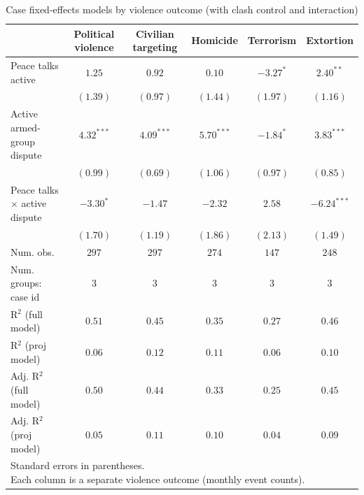 
\begin{table}
\caption{Case fixed-effects models by violence outcome (with clash control and interaction)}
\begin{center}
\begin{tabular}{l c c c c c}
\toprule
 & Political violence & Civilian targeting & Homicide & Terrorism & Extortion \\
\midrule
Peace talks active           & $1.25$       & $0.92$       & $0.10$       & $-3.27^{*}$ & $2.40^{**}$   \\
                             & $(1.39)$     & $(0.97)$     & $(1.44)$     & $(1.97)$    & $(1.16)$      \\
Active armed-group dispute   & $4.32^{***}$ & $4.09^{***}$ & $5.70^{***}$ & $-1.84^{*}$ & $3.83^{***}$  \\
                             & $(0.99)$     & $(0.69)$     & $(1.06)$     & $(0.97)$    & $(0.85)$      \\
Peace talks × active dispute & $-3.30^{*}$  & $-1.47$      & $-2.32$      & $2.58$      & $-6.24^{***}$ \\
                             & $(1.70)$     & $(1.19)$     & $(1.86)$     & $(2.13)$    & $(1.49)$      \\
\midrule
Num. obs.                    & $297$        & $297$        & $274$        & $147$       & $248$         \\
Num. groups: case id        & $3$          & $3$          & $3$          & $3$         & $3$           \\
R$^2$ (full model)           & $0.51$       & $0.45$       & $0.35$       & $0.27$      & $0.46$        \\
R$^2$ (proj model)           & $0.06$       & $0.12$       & $0.11$       & $0.06$      & $0.10$        \\
Adj. R$^2$ (full model)      & $0.50$       & $0.44$       & $0.33$       & $0.25$      & $0.45$        \\
Adj. R$^2$ (proj model)      & $0.05$       & $0.11$       & $0.10$       & $0.04$      & $0.09$        \\
\bottomrule
\multicolumn{6}{l}{\scriptsize{\parbox{\linewidth}{Standard errors in parentheses.\\[0.35em] Each column is a separate violence outcome (monthly event counts).}}}
\end{tabular}
\label{tab:violence_case_fe}
\end{center}
\end{table}
